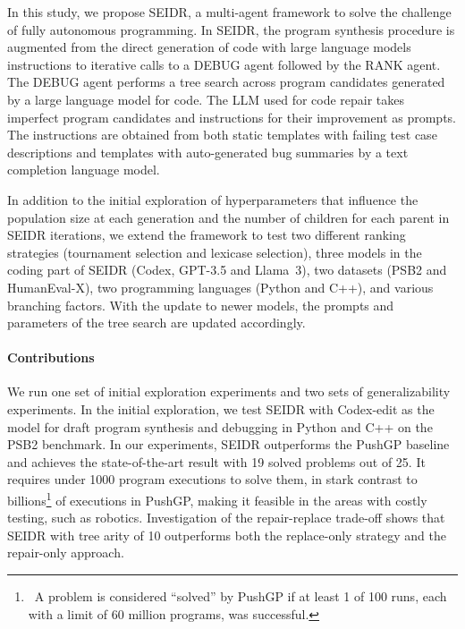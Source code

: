 In this study, we propose SEIDR, a multi-agent framework to solve the challenge of fully autonomous programming. 
In SEIDR, the program synthesis procedure is augmented from the direct generation of code with large language models instructions to iterative calls to a DEBUG agent followed by the RANK agent. 
The DEBUG agent performs a tree search across program candidates generated by a large language model for code.
The LLM used for code repair takes imperfect program candidates and instructions for their improvement as prompts. 
The instructions are obtained from both static templates with failing test case descriptions and templates with auto-generated bug summaries by a text completion language model. 

In addition to the initial exploration of hyperparameters that influence the population size at each generation and the number of children for each parent in SEIDR iterations, we extend the framework to test two different ranking strategies (tournament selection and lexicase selection), three models in the coding part of SEIDR (Codex, GPT-3.5 and Llama~3), two datasets (PSB2 and HumanEval-X), two programming languages (Python and C++), and various branching factors. 
With the update to newer models, the prompts and parameters of the tree search are updated accordingly. 

\paragraph{Contributions}
We run one set of initial exploration experiments and two sets of generalizability experiments. 
In the initial exploration, we test SEIDR with Codex-edit as the model for draft program synthesis and debugging in Python and C++ on the PSB2 benchmark. 
In our experiments, SEIDR outperforms the PushGP baseline and achieves the state-of-the-art result with 19 solved problems out of 25. 
It requires under 1000 program executions to solve them, in stark contrast to billions\footnote{~A problem is considered ``solved'' by PushGP if at least 1 of 100 runs, each with a limit of 60 million programs, was successful.} of executions in PushGP, making it feasible in the areas with costly testing, such as robotics.
Investigation of the repair-replace trade-off shows that SEIDR with tree arity of 10 outperforms both the replace-only strategy and the repair-only approach. 

